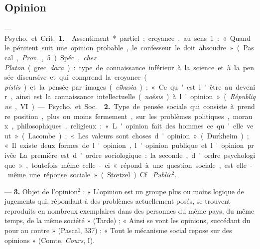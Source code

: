 \subsection{Opinion}
 — \si{Psycho.} et \si{Crit.} {\bf 1.} 
Assentiment* partiel ; croyance, au sens 1 : « Quand le pénitent suit une
opinion probable, le confesseur le doit absoudre » (Pascal, {\it Prov.}, 5).
Spéc., {\it chez Platon} (grec {\it doxa}) : type de connaissance inférieur à
la science et à la pensée discursive et qui comprend la croyance ({\it
pistis}) et la pensée par images ({\it eïkasia}) : « Ce qu'est l'être au
devenir, ainsi est la connaissance intellectuelle ({\it noêsis}) à l'opinion
» ({\it République}, VI).

 — \si{Psycho.} et \si{Soc.}  {\bf 2.} Type de
pensée sociale qui consiste à prendre position, plus ou moins fermement, sur
les problèmes politiques, moraux, philosophiques, religieux : « L'opinion
fait des hommes ce qu'elle veut » (Lacombe) ; « Les valeurs sont choses
d'opinion » (Durkheim) ; « Il existe deux formes de l'opinion, l'opinion
publique et l'opinion privée. La première est d'ordre sociologique: ... la
seconde, d'ordre psychologique », toutefois même celle-ci « répond à une
question sociale, est elle-même une réponse sociale » (Stœtzel). Cf. {\it
Public}$^2$.

 —  {\bf 3.} Objet de l'opinion$^2$ : « L'opinion
est un groupe plus ou moins logique de jugements qui, répondant à des
problèmes actuellement posés, se trouvent reproduits en nombreux exemplaires
dans des personnes du même pays, du même temps, de la même société
» (Tarde) ; « Ainsi se vont les opinions, succédant du pour au contre
» (Pascal, 337) ; « Tout le mécanisme social repose sur des opinions
» (Comte, {\it Cours}, I).

